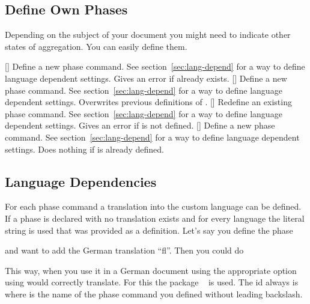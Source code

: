 \documentclass{chemmacros-manual}
\begin{document}
\subsection{Define Own Phases}
Depending on the subject of your document you might need to indicate other
states of aggregation.  You can easily define them.
\begin{commands}
  []
    Define a new phase command.  See section~\vref{sec:lang-depend} for a way
    to define language dependent settings.  Gives an error if 
    already exists.
  []
    Define a new phase command. See section~\vref{sec:lang-depend} for a way to
    define language dependent settings.  Overwrites previous definitions of
    .
  []
    Redefine an existing phase command.  See section~\vref{sec:lang-depend} for
    a way to define language dependent settings.  Gives an error if 
    is not defined.
  []
    Define a new phase command.  See section~\vref{sec:lang-depend} for a way
    to define language dependent settings.  Does nothing if  is
    already defined.
\end{commands}

\begin{example}
  \NewChemPhase{} %
  \NewChemPhase{} %
  \NewChemPhase{} %
     \par
     
\end{example}

\subsection{Language Dependencies}\label{sec:lang-depend}
For each phase command a translation into the custom language can be defined.
If a phase is declared with  no translation exists and
for every  language the literal string is used that was provided
as a definition.  Let's say you define the phase
\begin{sourcecode}
  \NewChemPhase{}
\end{sourcecode}
and want to add the German translation ``f\/l''.  Then you could do
\begin{sourcecode}
\end{sourcecode}
This way, when you use it in a German document using the appropriate
 option using  would correctly translate.  For this the
package ~\cite{pkg:translations} is used.  The \acs{id}
always is  where  is the name of the
phase command you defined without leading backslash.
\end{document}
